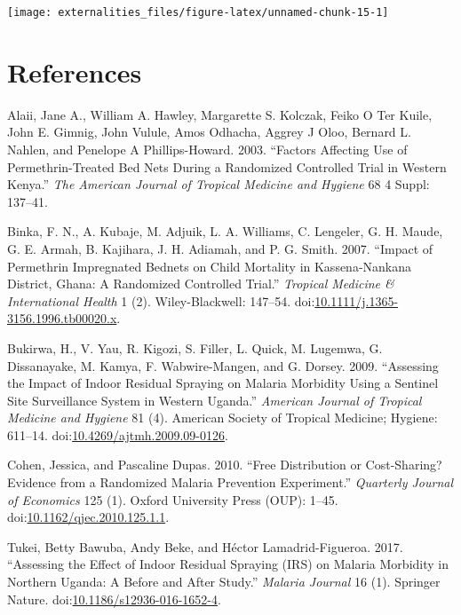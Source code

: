 \documentclass[]{article}
\begin{document}
\begin{center}\texttt{[image: externalities\_files/figure-latex/unnamed-chunk-15-1]} \end{center}

\section*{References}\label{references}

\hypertarget{refs}{}
\hypertarget{ref-Alaii2003FactorsAU}{}
Alaii, Jane A., William A. Hawley, Margarette S. Kolczak, Feiko O Ter
Kuile, John E. Gimnig, John Vulule, Amos Odhacha, Aggrey J Oloo, Bernard
L. Nahlen, and Penelope A Phillips-Howard. 2003. ``Factors Affecting Use
of Permethrin-Treated Bed Nets During a Randomized Controlled Trial in
Western Kenya.'' \emph{The American Journal of Tropical Medicine and
Hygiene} 68 4 Suppl: 137--41.

\hypertarget{ref-Binka2007}{}
Binka, F. N., A. Kubaje, M. Adjuik, L. A. Williams, C. Lengeler, G. H.
Maude, G. E. Armah, B. Kajihara, J. H. Adiamah, and P. G. Smith. 2007.
``Impact of Permethrin Impregnated Bednets on Child Mortality in
Kassena-Nankana District, Ghana: A Randomized Controlled Trial.''
\emph{Tropical Medicine \& International Health} 1 (2). Wiley-Blackwell:
147--54.
doi:\href{https://doi.org/10.1111/j.1365-3156.1996.tb00020.x}{10.1111/j.1365-3156.1996.tb00020.x}.

\hypertarget{ref-Bukirwa2009}{}
Bukirwa, H., V. Yau, R. Kigozi, S. Filler, L. Quick, M. Lugemwa, G.
Dissanayake, M. Kamya, F. Wabwire-Mangen, and G. Dorsey. 2009.
``Assessing the Impact of Indoor Residual Spraying on Malaria Morbidity
Using a Sentinel Site Surveillance System in Western Uganda.''
\emph{American Journal of Tropical Medicine and Hygiene} 81 (4).
American Society of Tropical Medicine; Hygiene: 611--14.
doi:\href{https://doi.org/10.4269/ajtmh.2009.09-0126}{10.4269/ajtmh.2009.09-0126}.

\hypertarget{ref-Cohen2010}{}
Cohen, Jessica, and Pascaline Dupas. 2010. ``Free Distribution or
Cost-Sharing? Evidence from a Randomized Malaria Prevention
Experiment.'' \emph{Quarterly Journal of Economics} 125 (1). Oxford
University Press (OUP): 1--45.
doi:\href{https://doi.org/10.1162/qjec.2010.125.1.1}{10.1162/qjec.2010.125.1.1}.

\hypertarget{ref-Tukei2017}{}
Tukei, Betty Bawuba, Andy Beke, and Héctor Lamadrid-Figueroa. 2017.
``Assessing the Effect of Indoor Residual Spraying (IRS) on Malaria
Morbidity in Northern Uganda: A Before and After Study.'' \emph{Malaria
Journal} 16 (1). Springer Nature.
doi:\href{https://doi.org/10.1186/s12936-016-1652-4}{10.1186/s12936-016-1652-4}.
\end{document}
